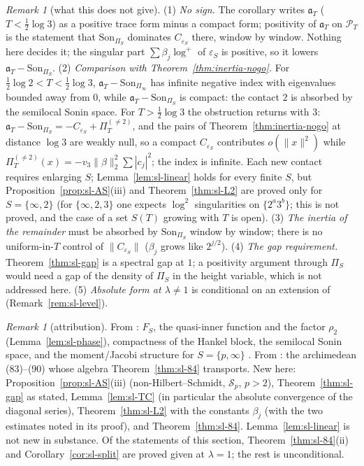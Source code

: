 \documentclass[11pt]{amsart}
\theoremstyle{definition}
\theoremstyle{remark}
\newtheorem{remark}[theorem]{Remark}
\newcommand{\PT}{\mathcal P_T}
\begin{document}
\begin{remark}[what this does not give]\label{rem:sl-not}
(1) \emph{No sign.} The corollary writes $\mathfrak a_T$ ($T<\frac12\log3$) as a positive trace form minus a compact
form; positivity of $\mathfrak a_T$ on $\PT$ is the statement that $\mathrm{Son}_{\Pi_S}$ dominates
$C_{\varepsilon_S}$ there, window by window. Nothing here decides it; the singular part
$\sum\beta_j\log^+$ of $\varepsilon_S$ is positive, so it lowers $\mathfrak a_T-\mathrm{Son}_{\Pi_S}$.
(2) \emph{Comparison with Theorem~\ref{thm:inertia-nogo}.} For $\frac12\log2<T<\frac12\log3$,
$\mathfrak a_T-\mathrm{Son}_{\Pi_\infty}$ has infinite negative index with eigenvalues bounded away from $0$, while
$\mathfrak a_T-\mathrm{Son}_{\Pi_S}$ is compact: the contact $2$ is absorbed by the semilocal Sonin space. For
$T>\frac12\log3$ the obstruction returns with $3$: $\mathfrak a_T-\mathrm{Son}_{\Pi_S}=-C_{\varepsilon_S}+\Pi^{(\ne2)}_T$,
and the pairs of Theorem~\ref{thm:inertia-nogo} at distance $\log3$ are weakly null, so a compact $C_{\varepsilon_S}$
contributes $o(\|x\|^2)$ while $\Pi^{(\ne2)}_T(x)=-v_3\|\beta\|_2^2\sum|c_j|^2$; the index is infinite. Each new contact
requires enlarging $S$; Lemma~\ref{lem:sl-linear} holds for every finite $S$, but
Proposition~\ref{prop:sl-AS}(iii) and Theorem~\ref{thm:sl-L2} are proved only for $S=\{\infty,2\}$
(for $\{\infty,2,3\}$ one expects $\log^2$ singularities on $\{2^a3^b\}$; this is not proved, and the case of a set
$S(T)$ growing with $T$ is open).
(3) \emph{The inertia of the remainder} must be absorbed by $\mathrm{Son}_{\Pi_S}$ window by window; there is no
uniform-in-$T$ control of $\|C_{\varepsilon_S}\|$ ($\beta_j$ grows like $2^{j/2}$).
(4) \emph{The gap requirement.} Theorem~\ref{thm:sl-gap} is a spectral gap at $1$; a positivity argument through
$\Pi_S$ would need a gap of the density of $\Pi_S$ in the height variable, which is not addressed here.
(5) \emph{Absolute form at $\lambda\ne1$} is conditional on an extension of \cite[Thm.~4.7]{ConnesConsani2021}
(Remark~\ref{rem:sl-level}).
\end{remark}

\begin{remark}[attribution]\label{rem:sl-new}
From \cite{CCquasi2020,CCM2023,CCM2024}: $F_S$, the quasi-inner function and the factor $\rho_2$
(Lemma~\ref{lem:sl-phase}), compactness of the Hankel block, the semilocal Sonin space, and the moment/Jacobi
structure for $S=\{p,\infty\}$ \cite{CCM2024}. From \cite{ConnesConsani2021}: the archimedean (83)--(90) whose
algebra Theorem~\ref{thm:sl-84} transports. New here: Proposition~\ref{prop:sl-AS}(iii) (non-Hilbert--Schmidt,
$\mathcal S_p$, $p>2$), Theorem~\ref{thm:sl-gap} as stated, Lemma~\ref{lem:sl-TC} (in particular the absolute
convergence of the diagonal series), Theorem~\ref{thm:sl-L2} with the constants $\beta_j$ (with the two estimates
noted in its proof), and Theorem~\ref{thm:sl-84}. Lemma~\ref{lem:sl-linear} is not new in substance.
Of the statements of this section, Theorem~\ref{thm:sl-84}(ii) and Corollary~\ref{cor:sl-split} are proved
given \cite[Thm.~4.7]{ConnesConsani2021} at $\lambda=1$; the rest is unconditional.
\end{remark}
\end{document}
